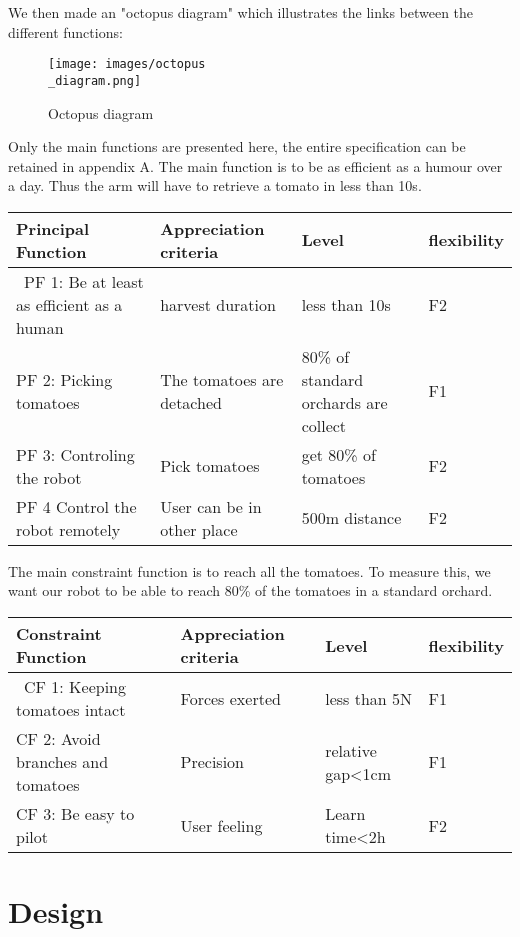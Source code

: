 \documentclass[oneside]{book}
\begin{document}
We then made an "octopus diagram" which illustrates the links between the different functions: 
\begin{figure}[ht]
    \centering
    \texttt{[image: images/octopus\\\_diagram.png]}
    \caption{Octopus diagram}
    \label{fig:mesh1}
\end{figure}

\bigbreak

Only the main functions are presented here, the entire specification can be retained in appendix A. The main function is to be as efficient as a humour over a day. Thus the arm will have to retrieve a tomato in less than 10s. 

\begin{center}
    \begin{tabular}{|p{3cm} | p{3cm} | p{3cm} | p{3cm} |} 
        \hline
        \textbf{Principal Function} & \textbf{Appreciation criteria} & \textbf{Level} & \textbf{flexibility} \\ [0.5ex] 
        \hline\
        PF 1: Be at least as efficient as a human & harvest duration & less than 10s & F2 \\ 
        \hline
        PF 2: Picking tomatoes & The tomatoes are detached & 80\% of standard orchards are collect & F1 \\
        \hline
        PF 3: Controling the robot & Pick tomatoes & get 80\% of tomatoes & F2 \\
        \hline
        PF 4 Control the robot remotely  & User can be in other place & 500m distance & F2 \\
        \hline
    \end{tabular}
\end{center}

\bigbreak

The main constraint function is to reach all the tomatoes. To measure this, we want our robot to be able to reach 80\% of the tomatoes in a standard orchard. 

\begin{center}
    \begin{tabular}{|p{3cm} | p{3cm} | p{3cm} | p{3cm} |} 
        \hline
        \textbf{Constraint Function} & \textbf{Appreciation criteria} & \textbf{Level} & \textbf{flexibility} \\ [0.5ex] 
        \hline\
        CF 1: Keeping tomatoes intact & Forces exerted & less than 5N & F1 \\ 
        \hline
        CF 2: Avoid branches and tomatoes & Precision & relative gap<1cm & F1 \\
        \hline
        CF 3: Be easy to pilot & User feeling & Learn time<2h & F2 \\
        \hline
    \end{tabular}
\end{center}

\chapter{Design}
\end{document}

